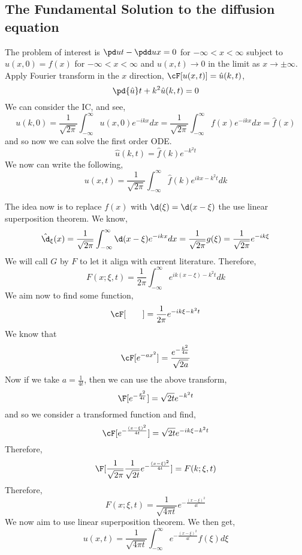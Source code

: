 \subsection{The Fundamental Solution to the diffusion equation}
The problem of interest is $\pd u t - \pdd u x = 0$ for $-\infty < x < \infty$ subject to $u(x, 0) = f(x)$ for $-\infty < x < \infty$ and $u(x, t) \to 0$ in the limit as $x \to \pm \infty$. Apply Fourier transform in the $x$ direction, $\cF [u(x, t)] = \hat u(k, t)$,
$$ \pd {\hat u} t + k^2 \hat u(k, t) = 0 $$
We can consider the IC, and see,
$$ u(k, 0) = \frac{1}{\sqrt{2\pi}}\int_{-\infty}^\infty u(x, 0)e^{-ikx}dx = \frac{1}{\sqrt{2\pi}}\int_{-\infty}^\infty f(x)e^{-ikx}dx = \hat f(x) $$
and so now we can solve the first order ODE.
$$ \hat u(k, t) = \hat f(k)e^{-k^2t} $$
We now can write the following,
$$ u(x, t) = \frac{1}{\sqrt{2\pi}}\int_{-\infty}^\infty \hat f(k)e^{ikx-k^2t}dk $$

\noindent
The idea now is to replace $f(x)$ with $\d(\xi) = \d(x - \xi)$ the use linear superposition theorem. We know,
$$ \hat \d_\xi(x) = \frac{1}{\sqrt{2\pi}}\int_{-\infty}^\infty \d(x - \xi)e^{-ikx}dx = \frac{1}{\sqrt{2\pi}}g(\xi) = \frac{1}{\sqrt{2\pi}}e^{-ik\xi} $$
We will call $G$ by $F$ to let it align with current literature. Therefore,
$$ F(x; \xi, t) = \frac{1}{2\pi}\int_{-\infty}^\infty e^{ik(x - \xi) - k^2t}dk $$
We aim now to find some function,
$$ \cF[ \qquad ] = \frac{1}{2\pi} e^{-ik\xi - k^2t} $$
We know that
$$ \cF [ e^{-ax^2} ] = \frac{e^{-\frac{k^2}{4a}}}{\sqrt{2a}}$$
Now if we take $a = \frac{1}{4t}$, then we can use the above transform,
$$ \F[ e^{-\frac{x^2}{4t}}] = \sqrt{2t}e^{-k^2t} $$
and so we consider a transformed function and find,
$$ \cF[e^{-\frac{(x - \xi)^2}{4t}}] = \sqrt{2t}e^{-ik\xi - k^2t} $$
Therefore,
$$ \F [ \frac{1}{\sqrt{2\pi}} \frac{1}{\sqrt{2t}} e^{-\frac{(x - \xi)^2}{4t}}] = F(k; \xi, t) $$
Therefore,
$$ F(x; \xi, t) = \frac{1}{\sqrt{4\pi t}} e^{-\frac{(x - \xi)^2}{4t}} $$
We now aim to use linear superposition theorem. We then get,
$$ u(x, t) = \frac{1}{\sqrt{4\pi t}}\int_{-\infty}^\infty e^{-\frac{(x - \xi)^2}{4t}}f(\xi)d\xi $$

\noindent
